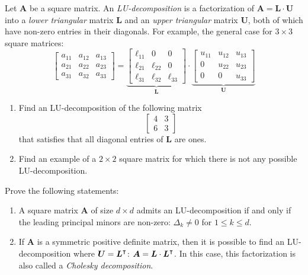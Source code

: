 \begin{problem}[Basic]
Let $\boldsymbol{A}$ be a square matrix.  An \emph{LU-decomposition} is a factorization of $\boldsymbol{A}=\boldsymbol{L} \cdot \boldsymbol{U}$ into a \emph{lower triangular} matrix $\boldsymbol{L}$ and an \emph{upper triangular} matrix $\boldsymbol{U}$, both of which have non-zero entries in their diagonals.  For example, the general case for $3 \times 3$ square matrices:
\begin{equation*}
\begin{bmatrix} 
a_{11} & a_{12} & a_{13} \\
a_{21} & a_{22} & a_{23} \\
a_{31} & a_{32} & a_{33}
\end{bmatrix} = \underbrace{\begin{bmatrix}
\ell_{11} & 0 & 0 \\
\ell_{21} & \ell_{22} & 0 \\
\ell_{31} & \ell_{32} & \ell_{33}
\end{bmatrix}}_{\boldsymbol{L}} \cdot \underbrace{\begin{bmatrix}
u_{11} & u_{12} & u_{13} \\
0 & u_{22} & u_{23} \\
0 & 0 & u_{33}
\end{bmatrix}}_{\boldsymbol{U}}
\end{equation*}
\begin{enumerate}
	\item Find an LU-decomposition of the following matrix
	\begin{equation*}
	\begin{bmatrix} 4 & 3 \\ 6 & 3 \end{bmatrix}
	\end{equation*}
	that satisfies that all diagonal entries of $\boldsymbol{L}$ are ones.
	\item Find an example of a $2\times 2$ square matrix for which there is not any possible LU-decomposition.
\end{enumerate}
\end{problem}

\begin{problem}[Advanced]
Prove the following statements:
\begin{enumerate}
	\item A square matrix $\boldsymbol{A}$ of size $d \times d$ admits an LU-decomposition if and only if the leading principal minors are non-zero: $\Delta_k \neq 0$ for $1 \leq k \leq d$.
	\item If $\boldsymbol{A}$ is a symmetric positive definite matrix, then it is possible to find an LU-decomposition where $\boldsymbol{U} = {\boldsymbol{L}}^\intercal$: $\boldsymbol{A} = \boldsymbol{L} \cdot {\boldsymbol{L}}^\intercal$.  In this case, this factorization is also called a \emph{Cholesky decomposition}.
\end{enumerate}
\end{problem}


